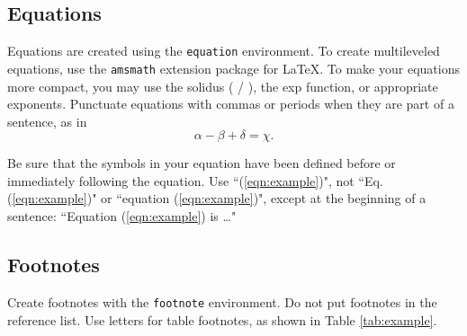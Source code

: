 \documentclass[conference]{IEEEtran}
\begin{document}
\subsection{Equations}
Equations are created using the \texttt{equation} environment. To create multileveled equations, use the \texttt{amsmath} extension package for \LaTeX{}. To make your equations more compact, you may use the solidus ( / ), the exp function, or appropriate exponents. Punctuate equations with commas or periods when they are part of a sentence, as in
\begin{equation}
\label{eqn:example}
\alpha - \beta + \delta = \chi.
\end{equation}

Be sure that the symbols in your equation have been defined before or immediately following the equation. Use ``(\ref{eqn:example})", not ``Eq. (\ref{eqn:example})" or ``equation (\ref{eqn:example})", except at the beginning of a sentence: ``Equation (\ref{eqn:example}) is \ldots"

\subsection{Footnotes}
Create footnotes with the \texttt{footnote} environment. Do not put footnotes in the reference list. Use letters for table footnotes, as shown in Table \ref{tab:example}.
\end{document}
